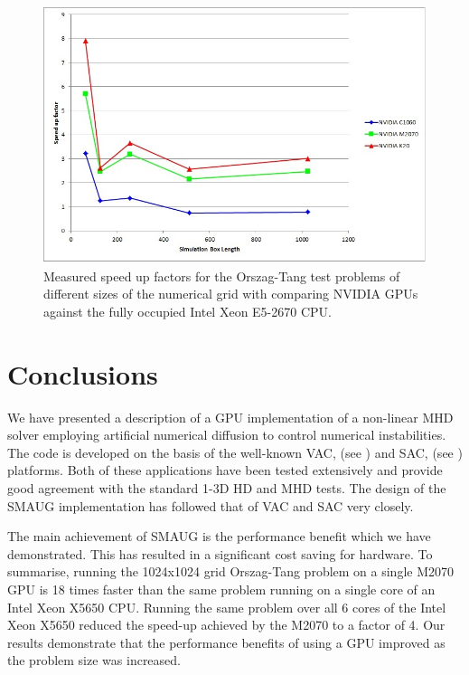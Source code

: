 
\begin{figure}[h]
\includegraphics[scale=0.7]{fig13_E5-2670_8c.JPG}
\caption{ Measured speed up factors for the Orszag-Tang test problems of different sizes of the numerical grid with comparing NVIDIA GPUs against the fully occupied Intel Xeon E5-2670  CPU.}
\end{figure}


\section{Conclusions}
We have presented a description of a GPU implementation of a non-linear MHD solver employing artificial numerical diffusion to control numerical instabilities. The code  is developed on the basis of the well-known VAC, (see \citep{Toth et al. 1998} ) and SAC, (see \citep{Shelyag et al. 2008}) platforms. Both of these applications have been tested extensively and provide good agreement with the standard 1-3D HD and MHD tests. The design of the SMAUG implementation has followed that of VAC and SAC very closely. 

The main achievement of SMAUG is the performance benefit which we have demonstrated. This has resulted in a significant cost saving for hardware. To summarise, running the 1024x1024 grid Orszag-Tang problem on a single M2070 GPU is 18 times faster than the same problem running on a single core of an Intel Xeon X5650 CPU. Running the same problem over all 6 cores of the Intel Xeon X5650 reduced the speed-up achieved by the M2070 to a factor of 4. Our results demonstrate that the performance benefits of using a GPU improved as the problem size was increased.

